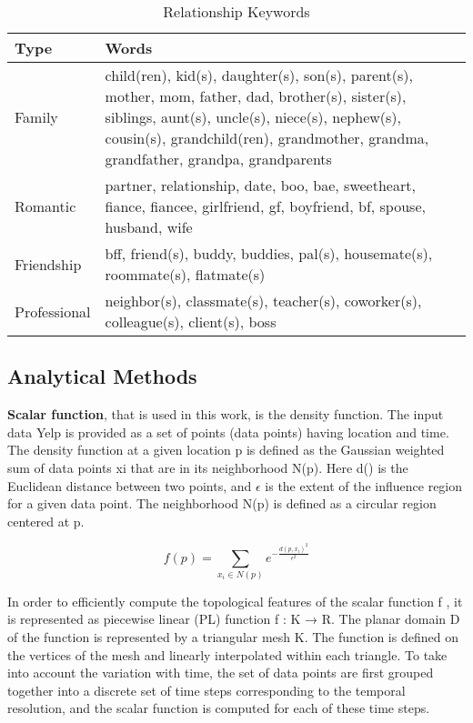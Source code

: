 \begin{table}[htbp]
    \centering
    \caption{Relationship Keywords}
    \begin{tabular}{|p{1.5cm}|p{6.5cm}|}
    \hline
    \textbf{Type} & \textbf{Words} \\
    \hline
    Family & child(ren), kid(s), daughter(s), son(s), parent(s), mother, mom, father, dad, brother(s), sister(s), siblings, aunt(s), uncle(s), niece(s), nephew(s), cousin(s), grandchild(ren), grandmother, grandma, grandfather, grandpa, grandparents \\
    \hline
    Romantic & partner, relationship, date, boo, bae, sweetheart, fiance, fiancee, girlfriend, gf, boyfriend, bf, spouse, husband, wife \\
    \hline
    Friendship & bff, friend(s), buddy, buddies, pal(s), housemate(s), roommate(s), flatmate(s) \\
    \hline
    Professional & neighbor(s), classmate(s), teacher(s), coworker(s), colleague(s), client(s), boss \\
    \hline
    \end{tabular}
\end{table}

\subsection{Analytical Methods}

\textbf{Scalar function}, that is used in this work, is the
density function. The input data Yelp is provided as a set of
points (data points) having location and time. The density function at
a given location p is defined as the Gaussian weighted sum of data points xi
that are in its neighborhood N(p). Here d() is the Euclidean distance between two points, and $\epsilon$ is the extent of the influence region for a given data point. The neighborhood N(p) is defined
as a circular region centered at p. 

\begin{equation}
f(p) = \sum\limits_{x_i\in N(p)} e^{-\frac{d(p,x_i)^2}{\epsilon^2}}
\end{equation}

In order to efficiently compute the topological features of the scalar function f , it is represented as piecewise linear (PL) function f : K →
R. The planar domain D of the function is represented by a triangular mesh K. The function is defined on the vertices of the mesh and linearly interpolated within each triangle.
To take into account the variation with time, the set of data points
are first grouped together into a discrete set of time steps corresponding to the temporal resolution, and the scalar function is computed for each of these time steps.

